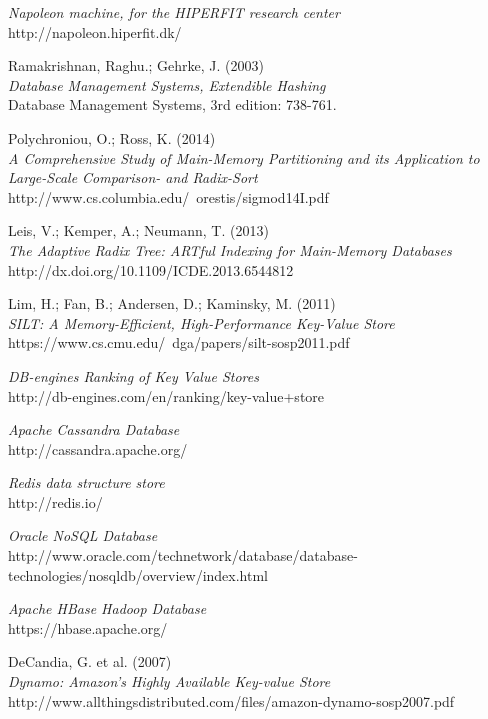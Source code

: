 \documentclass[11pt]{report} %
\begin{document}
\begin{thebibliography}{99}
 \emph{Napoleon machine, for the HIPERFIT research center}\\
 http://napoleon.hiperfit.dk/

 Ramakrishnan, Raghu.; Gehrke, J. (2003)\\
 \emph{Database Management Systems, Extendible Hashing}\\
 Database Management Systems, 3rd edition: 738-761.

 Polychroniou, O.; Ross, K. (2014)\\
 \emph{A Comprehensive Study of Main-Memory Partitioning and its Application to Large-Scale Comparison- and Radix-Sort}\\
 http://www.cs.columbia.edu/~orestis/sigmod14I.pdf

 Leis, V.; Kemper, A.; Neumann, T. (2013)\\
 \emph{The Adaptive Radix Tree: ARTful Indexing for Main-Memory Databases}\\
 http://dx.doi.org/10.1109/ICDE.2013.6544812

 Lim, H.; Fan, B.; Andersen, D.; Kaminsky, M. (2011)\\
 \emph{SILT: A Memory-Efficient, High-Performance Key-Value Store}\\
 https://www.cs.cmu.edu/~dga/papers/silt-sosp2011.pdf

 \emph{DB-engines Ranking of Key Value Stores}\\
 http://db-engines.com/en/ranking/key-value+store

 \emph{Apache Cassandra Database}\\
 http://cassandra.apache.org/

 \emph{Redis data structure store}\\
 http://redis.io/

 \emph{Oracle NoSQL Database}\\
 http://www.oracle.com/technetwork/database/database-technologies/nosqldb/overview/index.html

 \emph{Apache HBase Hadoop Database} \\
 https://hbase.apache.org/

 DeCandia, G. et al. (2007)\\
 \emph{Dynamo: Amazon’s Highly Available Key-value Store}\\
 http://www.allthingsdistributed.com/files/amazon-dynamo-sosp2007.pdf


\end{thebibliography}
\end{document}
